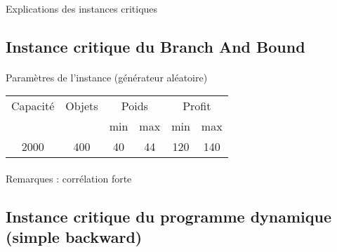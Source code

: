 \documentclass[12pt]{article}
\begin{document}
\paragraph{}Explications des instances critiques

\subsection{Instance critique du Branch And Bound}

\paragraph{}Paramètres de l'instance (générateur aléatoire)

\begin{tabular}{|c|c|c|c|c|c|}
\hline
Capacité & Objets & \multicolumn{2}{c|}{Poids} & \multicolumn{2}{c|}{Profit} \\
\cline{3-6}
& & min & max & min & max \\
\hline
2000 & 400 & 40 & 44 & 120 & 140 \\
\hline
\end{tabular}

\begin{figure}[!h]
\begin{floatrow}
\end{floatrow}
\end{figure}

\paragraph{}Remarques : corrélation forte

\subsection{Instance critique du programme dynamique (simple backward)}
\end{document}
